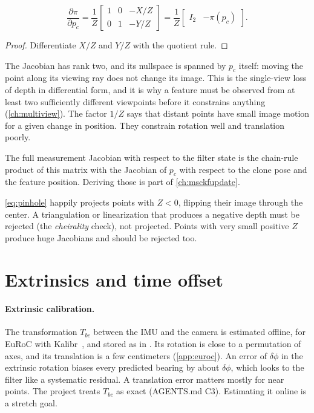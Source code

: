 \begin{proposition}
\label{prop:proj-jacobian}
\begin{equation}
  \frac{\partial\pi}{\partial p_c} = \frac{1}{Z}\begin{bmatrix} 1 & 0 & -X/Z \\ 0 & 1 & -Y/Z \end{bmatrix}
  = \frac1Z\begin{bmatrix} I_2 & -\pi(p_c) \end{bmatrix}.
\end{equation}
\end{proposition}
\begin{proof}
Differentiate $X/Z$ and $Y/Z$ with the quotient rule.
\end{proof}

The Jacobian has rank two, and its nullspace is spanned by $p_c$ itself: moving the point along its viewing ray does
not change its image. This is the single-view loss of depth in differential form, and it is why a feature must be
observed from at least two sufficiently different viewpoints before it constrains anything (\cref{ch:multiview}).
The factor $1/Z$ says that distant points have small image motion for a given change in position. They constrain
rotation well and translation poorly.

The full measurement Jacobian with respect to the filter state is the chain-rule product of this matrix with the
Jacobian of $p_c$ with respect to the clone pose and the feature position. Deriving those is part of
\cref{ch:msckfupdate}.

\begin{pitfall}
\eqref{eq:pinhole} happily projects points with $Z < 0$, flipping their image through the center. A triangulation or
linearization that produces a negative depth must be rejected (the \emph{cheirality} check), not projected. Points
with very small positive $Z$ produce huge Jacobians and should be rejected too.
\end{pitfall}

\section{Extrinsics and time offset}

\paragraph{Extrinsic calibration.} The transformation $T_{bc}$ between the IMU and the camera is estimated offline,
for EuRoC with Kalibr~\cite{furgale2013kalibr}, and stored as  in . Its rotation is close to a
permutation of axes, and its translation is a few centimeters (\cref{app:euroc}). An error of $\delta\phi$ in the extrinsic
rotation biases every predicted bearing by about $\delta\phi$, which looks to the filter like a systematic residual. A
translation error matters mostly for near points. The project treats $T_{bc}$ as exact (AGENTS.md C3). Estimating it
online is a stretch goal.


